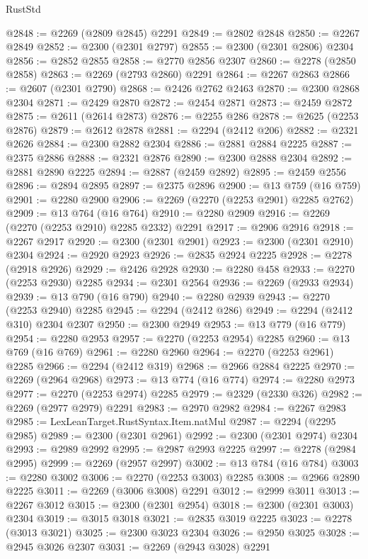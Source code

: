 \begin{lexlean}{RustStd}
\begin{coremodule}
{\begin{coremodule}
{{{{{{{{{{{{@2848 := @2269 (@2809 @2845) @2291
@2849 := @2802 @2848
@2850 := @2267 @2849
@2852 := @2300 (@2301 @2797)
@2855 := @2300 (@2301 @2806) @2304
@2856 := @2852 @2855
@2858 := @2770 @2856 @2307
@2860 := @2278 (@2850 @2858)
@2863 := @2269 (@2793 @2860) @2291
@2864 := @2267 @2863
@2866 := @2607 (@2301 @2790)
@2868 := @2426 @2762 @2463
@2870 := @2300 @2868 @2304
@2871 := @2429 @2870
@2872 := @2454 @2871
@2873 := @2459 @2872
@2875 := @2611 (@2614 @2873)
@2876 := @2255 @286
@2878 := @2625 (@2253 @2876)
@2879 := @2612 @2878
@2881 := @2294 (@2412 @206)
@2882 := @2321 @2626
@2884 := @2300 @2882 @2304
@2886 := @2881 @2884 @2225
@2887 := @2375 @2886
@2888 := @2321 @2876
@2890 := @2300 @2888 @2304
@2892 := @2881 @2890 @2225
@2894 := @2887 (@2459 @2892)
@2895 := @2459 @2556
@2896 := @2894 @2895
@2897 := @2375 @2896
@2900 := @13 @759 (@16 @759)
@2901 := @2280 @2900
@2906 := @2269 (@2270 (@2253 @2901) @2285 @2762)
@2909 := @13 @764 (@16 @764)
@2910 := @2280 @2909
@2916 := @2269 (@2270 (@2253 @2910) @2285 @2332) @2291
@2917 := @2906 @2916
@2918 := @2267 @2917
@2920 := @2300 (@2301 @2901)
@2923 := @2300 (@2301 @2910) @2304
@2924 := @2920 @2923
@2926 := @2835 @2924 @2225
@2928 := @2278 (@2918 @2926)
@2929 := @2426 @2928
@2930 := @2280 @458
@2933 := @2270 (@2253 @2930) @2285
@2934 := @2301 @2564
@2936 := @2269 (@2933 @2934)
@2939 := @13 @790 (@16 @790)
@2940 := @2280 @2939
@2943 := @2270 (@2253 @2940) @2285
@2945 := @2294 (@2412 @286)
@2949 := @2294 (@2412 @310) @2304 @2307
@2950 := @2300 @2949
@2953 := @13 @779 (@16 @779)
@2954 := @2280 @2953
@2957 := @2270 (@2253 @2954) @2285
@2960 := @13 @769 (@16 @769)
@2961 := @2280 @2960
@2964 := @2270 (@2253 @2961) @2285
@2966 := @2294 (@2412 @319)
@2968 := @2966 @2884 @2225
@2970 := @2269 (@2964 @2968)
@2973 := @13 @774 (@16 @774)
@2974 := @2280 @2973
@2977 := @2270 (@2253 @2974) @2285
@2979 := @2329 (@2330 @326)
@2982 := @2269 (@2977 @2979) @2291
@2983 := @2970 @2982
@2984 := @2267 @2983
@2985 := LexLeanTarget.RustSyntax.Item.natMul
@2987 := @2294 (@2295 @2985)
@2989 := @2300 (@2301 @2961)
@2992 := @2300 (@2301 @2974) @2304
@2993 := @2989 @2992
@2995 := @2987 @2993 @2225
@2997 := @2278 (@2984 @2995)
@2999 := @2269 (@2957 @2997)
@3002 := @13 @784 (@16 @784)
@3003 := @2280 @3002
@3006 := @2270 (@2253 @3003) @2285
@3008 := @2966 @2890 @2225
@3011 := @2269 (@3006 @3008) @2291
@3012 := @2999 @3011
@3013 := @2267 @3012
@3015 := @2300 (@2301 @2954)
@3018 := @2300 (@2301 @3003) @2304
@3019 := @3015 @3018
@3021 := @2835 @3019 @2225
@3023 := @2278 (@3013 @3021)
@3025 := @2300 @3023 @2304
@3026 := @2950 @3025
@3028 := @2945 @3026 @2307
@3031 := @2269 (@2943 @3028) @2291
}}}}}}}}}}}}
\end{coremodule}}
\end{coremodule}
\end{lexlean}
